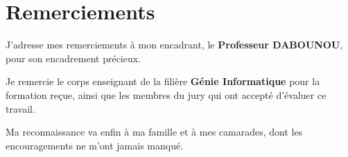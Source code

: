 \chapter*{Remerciements}
\thispagestyle{plain}

J'adresse mes remerciements à mon encadrant, le \textbf{Professeur DABOUNOU}, pour son encadrement précieux.

Je remercie le corps enseignant de la filière \textbf{Génie Informatique} pour la formation reçue, ainsi que les membres du jury qui ont accepté d'évaluer ce travail.

Ma reconnaissance va enfin à ma famille et à mes camarades, dont les encouragements ne m'ont jamais manqué.

